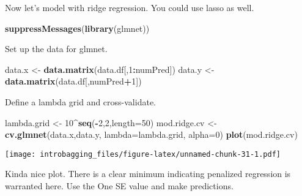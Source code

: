 \documentclass[]{article}
\newenvironment{Shaded}{\begin{snugshade}}{\end{snugshade}}
\newcommand{\DataTypeTok}[1]{\textcolor[rgb]{0.13,0.29,0.53}{#1}}
\newcommand{\DecValTok}[1]{\textcolor[rgb]{0.00,0.00,0.81}{#1}}
\newcommand{\FloatTok}[1]{\textcolor[rgb]{0.00,0.00,0.81}{#1}}
\newcommand{\KeywordTok}[1]{\textcolor[rgb]{0.13,0.29,0.53}{\textbf{#1}}}
\newcommand{\NormalTok}[1]{#1}
\newcommand{\OperatorTok}[1]{\textcolor[rgb]{0.81,0.36,0.00}{\textbf{#1}}}
\newcommand{\StringTok}[1]{\textcolor[rgb]{0.31,0.60,0.02}{#1}}
\begin{document}
Now let's model with ridge regression. You could use lasso as well.

\begin{Shaded}
\begin{Highlighting}[]
\KeywordTok{suppressMessages}\NormalTok{(}\KeywordTok{library}\NormalTok{(glmnet))}
\end{Highlighting}
\end{Shaded}

Set up the data for glmnet.

\begin{Shaded}
\begin{Highlighting}[]
\NormalTok{data.x <-}\StringTok{ }\KeywordTok{data.matrix}\NormalTok{(data.df[,}\DecValTok{1}\OperatorTok{:}\NormalTok{numPred])}
\NormalTok{data.y <-}\StringTok{ }\KeywordTok{data.matrix}\NormalTok{(data.df[,numPred}\OperatorTok{+}\DecValTok{1}\NormalTok{])}
\end{Highlighting}
\end{Shaded}

Define a lambda grid and cross-validate.

\begin{Shaded}
\begin{Highlighting}[]
\NormalTok{lambda.grid <-}\StringTok{ }\DecValTok{10}\OperatorTok{^}\KeywordTok{seq}\NormalTok{(}\OperatorTok{-}\DecValTok{2}\NormalTok{,}\DecValTok{2}\NormalTok{,}\DataTypeTok{length=}\DecValTok{50}\NormalTok{)}
\NormalTok{mod.ridge.cv <-}\StringTok{ }\KeywordTok{cv.glmnet}\NormalTok{(data.x,data.y,}
                          \DataTypeTok{lambda=}\NormalTok{lambda.grid,}
                          \DataTypeTok{alpha=}\DecValTok{0}\NormalTok{)}
\KeywordTok{plot}\NormalTok{(mod.ridge.cv)}
\end{Highlighting}
\end{Shaded}

\texttt{[image: introbagging\_files/figure-latex/unnamed-chunk-31-1.pdf]}

Kinda nice plot. There is a clear minimum indicating penalized
regression is warranted here. Use the One SE value and make predictions.

\begin{Shaded}
\end{Shaded}
\end{document}
